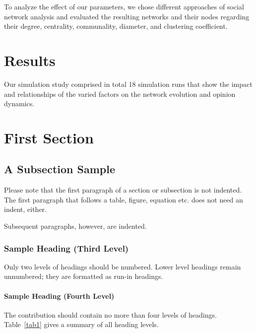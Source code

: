 \documentclass[runningheads]{llncs}
\begin{document}
To analyze the effect of our parameters, we chose different approaches
of social network analysis and evaluated the resulting networks and
their nodes regarding their degree, centrality, communality, diameter,
and clustering coefficient.

\hypertarget{results}{%
\section{Results}\label{results}}

Our simulation study comprised in total 18 simulation runs that show the
impact and relationships of the varied factors on the network evolution
and opinion dynamics.

\hypertarget{first-section}{%
\section{First Section}\label{first-section}}

\hypertarget{a-subsection-sample}{%
\subsection{A Subsection Sample}\label{a-subsection-sample}}

Please note that the first paragraph of a section or subsection is not
indented. The first paragraph that follows a table, figure, equation
etc. does not need an indent, either.

Subsequent paragraphs, however, are indented.

\hypertarget{sample-heading-third-level}{%
\subsubsection{Sample Heading (Third
Level)}\label{sample-heading-third-level}}

Only two levels of headings should be numbered. Lower level headings
remain unnumbered; they are formatted as run-in headings.

\hypertarget{sample-heading-fourth-level}{%
\paragraph{Sample Heading (Fourth
Level)}\label{sample-heading-fourth-level}}

The contribution should contain no more than four levels of headings.
Table~\ref{tab1} gives a summary of all heading levels.
\end{document}

